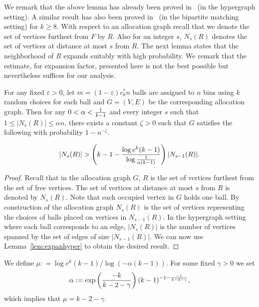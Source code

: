 We remark that the above lemma has already been proved in~\cite{art:fps10} (in the hypergraph setting). A similar result has also been proved in~\cite{fm12} (in the bipartite matching setting) for $k\ge 8$.
With respect to an allocation graph recall that we denote the set of vertices furthest from $F$ by $R$. Also for an integer $s$, $N_s(R)$ denotes the set of vertices at distance at most $s$ from $R$. The next lemma states that the neighborhood of $R$ expands suitably with high probability. We remark that the estimate, for expansion factor, presented here is not the best possible but nevertheless suffices for our analysis. 
\begin{lemma}\label{lem:expan}
For any fixed $\varepsilon>0$, let $m=(1-\varepsilon) c_k^* n$ balls are assigned to $n$ bins using $k$ random choices for each ball and $G=(V,E)$ be the corresponding allocation graph. Then for any $0<\alpha < {1\over k-1}$ and every integer $s$ such that $1\le | N_{s}(R)|\le \alpha n$,  there exists a constant $\zeta>0$ such that $G$  satisfies the following with probability $1-n^{-\zeta}$.

\[
	|N_{s}(R) | >  \left( k-1- {\log e^{k}(k-1) \over \log{1\over \alpha(k-1)}}\right)  | N_{s-1}(R)| . \]
	
\end{lemma}
\begin{proof}
Recall that in the allocation graph $G$,  $R$ is the set of vertices furthest from the set of free vertices. The set of vertices at distance at most $s$ from $R$ is denoted by $N_{s}(R)$. Note that each occupied vertex in $G$ holds one ball. By construction of the allocation graph $N_{s}(R)$ is the set of vertices representing the choices of balls placed on vertices in $N_{s-1}(R)$. In the hypergraph setting where each ball corresponds to an edge, $|N_{s}(R)|$ is the number of vertices spanned by the set of edges of size  $|N_{s-1}(R)|$. We can now use Lemma~\ref{lem:expanhyper} to obtain the desired result.
\end{proof}
We define $\mu: =   {\log e^{k}(k-1)/ \log {(- \alpha(k-1))}} .$ For some fixed $\gamma >0$ we set 
\begin{equation} \label{eq:alpha}
\alpha := \exp\left({-k\over k-2-\gamma}\right) (k-1)^{-1- {-1\over k-2-\gamma}},
\end{equation}
which implies that $\mu = k-2-\gamma$.

